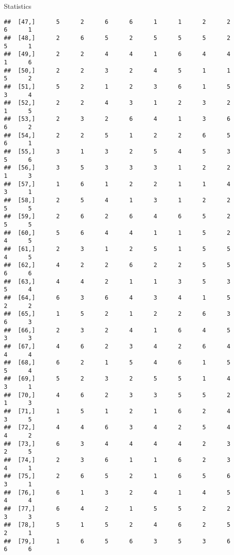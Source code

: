 \documentclass[
  ignorenonframetext,
]{beamer}
\begin{document}
\begin{frame}[fragile]{Statistics}
\begin{verbatim}
##  [47,]      5      2      6      6      1      1      2      2      6      1
##  [48,]      2      6      5      2      5      5      5      2      5      1
##  [49,]      2      2      4      4      1      6      4      4      1      6
##  [50,]      2      2      3      2      4      5      1      1      5      2
##  [51,]      5      2      1      2      3      6      1      5      3      4
##  [52,]      2      2      4      3      1      2      3      2      1      5
##  [53,]      2      3      2      6      4      1      3      6      6      2
##  [54,]      2      2      5      1      2      2      6      5      6      1
##  [55,]      3      1      3      2      5      4      5      3      5      6
##  [56,]      3      5      3      3      3      1      2      2      1      3
##  [57,]      1      6      1      2      2      1      1      4      3      1
##  [58,]      2      5      4      1      3      1      2      2      5      5
##  [59,]      2      6      2      6      4      6      5      2      5      5
##  [60,]      5      6      4      4      1      1      5      2      4      5
##  [61,]      2      3      1      2      5      1      5      5      4      5
##  [62,]      4      2      2      6      2      2      5      5      6      6
##  [63,]      4      4      2      1      1      3      5      3      5      4
##  [64,]      6      3      6      4      3      4      1      5      2      2
##  [65,]      1      5      2      1      2      2      6      3      6      3
##  [66,]      2      3      2      4      1      6      4      5      3      3
##  [67,]      4      6      2      3      4      2      6      4      4      4
##  [68,]      6      2      1      5      4      6      1      5      5      4
##  [69,]      5      2      3      2      5      5      1      4      3      1
##  [70,]      4      6      2      3      3      5      5      2      1      3
##  [71,]      1      5      1      2      1      6      2      4      3      5
##  [72,]      4      4      6      3      4      2      5      4      4      2
##  [73,]      6      3      4      4      4      4      2      3      2      5
##  [74,]      2      3      6      1      1      6      2      3      4      1
##  [75,]      2      6      5      2      1      6      5      6      3      1
##  [76,]      6      1      3      2      4      1      4      5      4      4
##  [77,]      6      4      2      1      5      5      2      2      3      3
##  [78,]      5      1      5      2      4      6      2      5      2      1
##  [79,]      1      6      5      6      3      5      3      6      6      6

\end{verbatim}
\end{frame}
\end{document}
